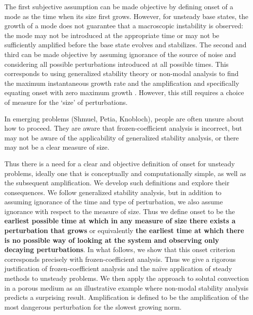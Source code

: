 \documentclass[letterpaper,prl,aps,twocolumn,reprint,superscriptaddress]{revtex4-1}
\begin{document}
The first subjective assumption can be made objective by defining onset of a mode as the time when its size first grows.  However, for unsteady base states, the growth of a mode does not guarantee that a macroscopic instability is observed: the mode may not be introduced at the appropriate time or may not be sufficiently amplified before the base state evolves and stabilizes.  The second and third can be made objective by assuming ignorance of the source of noise and considering all possible perturbations introduced at all possible times.  This corresponds to using generalized stability theory or non-modal analysis to find the maximum instantaneous growth rate and the amplification and specifically equating onset with zero maximum growth \cite{FarrellIoannou,SlimRama10}.  However, this still requires a choice of measure for the `size' of perturbations.

In emerging problems (Shmuel, Petia, Knobloch), people are often unsure about how to proceed.  They are aware that frozen-coefficient analysis is incorrect, but may not be aware of the applicability of generalized stability analysis, or there may not be a clear measure of size.

Thus there is a need for a clear and objective definition of onset for unsteady problems, ideally one that is conceptually and computationally simple, as well as the subsequent amplification.  We develop such definitions and explore their consequences.  We follow generalized stability analysis, but in addition to assuming ignorance of the time and type of perturbation, we also assume ignorance with respect to the measure of size.  Thus we define onset to be the {\bf earliest possible time at which in any measure of size there exists a perturbation that grows} or equivalently {\bf the earliest time at which there is no possible way of looking at the system and observing only decaying perturbations}.  In what follows, we show that this onset criterion corresponds precisely with frozen-coefficient analysis.  Thus we give a rigorous justification of frozen-coefficient analysis and the na\"ive application of steady methods to unsteady problems.  We then apply the approach to solutal convection in a porous medium as an illustrative example where non-modal stability analysis predicts a surprising result.  Amplification is defined to be the amplification of the most dangerous perturbation for the slowest growing norm.
\end{document}
